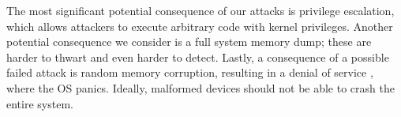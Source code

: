 The most significant potential consequence of our attacks is privilege escalation, which allows attackers to execute arbitrary code with kernel privileges. Another potential consequence we consider is a full system memory dump; these are harder to thwart and even harder to detect.  
Lastly, a consequence of a possible failed attack is random memory corruption, resulting in a denial of service \cite{MMT16}, where the OS panics. Ideally, malformed devices should not be able to crash the entire system. 
